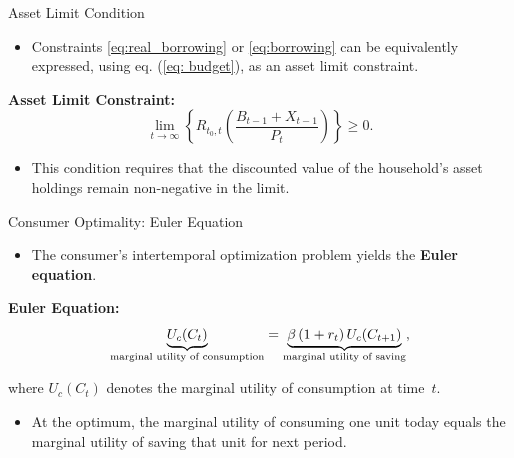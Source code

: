 \documentclass[11pt,aspectratio=169]{beamer}
\begin{document}
\begin{frame}[label=limit]{Asset Limit Condition}

\begin{itemize}
    \item Constraints  \eqref{eq:real_borrowing} or \eqref{eq:borrowing} can be equivalently expressed, using eq. (\ref{eq: budget}), as an asset limit constraint.
\end{itemize}

\vspace{0.25cm}
\noindent\textbf{ Asset Limit Constraint:}
\begin{equation}
\lim_{t\to \infty} \left\{ R_{t_0,t} \left( \frac{B_{t-1}+X_{t-1}}{P_t} \right) \right\} \ge 0.  \label{Blimit}
\end{equation}

\begin{itemize}
    \item This condition requires that the discounted value of the household’s asset holdings remain non-negative in the limit.
\end{itemize}

\vspace{0.3cm}
\begin{center}
\hyperlink{limit_proof}{}
\end{center}

\end{frame}
\begin{frame}[label=euler]{Consumer Optimality: Euler Equation}
\small

\begin{itemize}
  \item The consumer’s intertemporal optimization problem yields the \textbf{Euler equation}.
\end{itemize}

\vspace{0.3cm}
\noindent\textbf{Euler Equation:}
\begin{equation}
\underbrace{U_c(C_t)}_{\text{\scriptsize marginal utility of consumption}}
= 
\underbrace{\beta\,(1+r_t)\,U_c(C_{t+1})}_{\text{\scriptsize marginal utility of saving}},
\label{eq:euler}
\end{equation}

\hspace{0.6cm}where $U_c(C_t)$ denotes the marginal utility of consumption at time~$t$.

\vspace{0.25cm}
\begin{itemize}
  \item At the optimum, the marginal utility of consuming one unit today equals the marginal utility of saving that unit for next period.
\end{itemize}

\vspace{0.25cm}
\begin{center}
  \hyperlink{euler_proof}{}
\end{center}

\end{frame}
\end{document}
